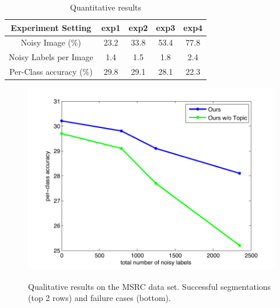 \begin{table}[!h]
\begin{center}
\begin{tabular}{|c|c|c|c|c|}
\hline
Experiment Setting & exp1 & exp2 & exp3 & exp4 \\
\hline
Noisy Image (\%) & 23.2 & 33.8 & 53.4 & 77.8 \\
\hline
Noisy Labels per Image & 1.4 & 1.5 & 1.8 & 2.4 \\
\hline
Per-Class accuracy (\%) & 29.8 & 29.1 & 28.1 & 22.3 \\
\hline
\end{tabular}
\end{center}
\caption{Quantitative results  }
\label{tab:ExpNoise}
\end{table}


\begin{figure}[h]
\begin{center}
    \includegraphics[width=1\linewidth]{fig_noisylabel.pdf}
\end{center}
    \caption{}
\label{fig:noisyexp}
\end{figure}


\begin{figure}
\begin{center}
\fbox{\rule{0pt}{2in} \rule{.9\linewidth}{0pt}}
\end{center}
   \caption{Qualitative results on the MSRC data set. Successful segmentations (top 2 rows) and failure cases (bottom).}
\label{fig:MSRC}
\end{figure}


